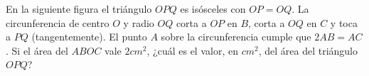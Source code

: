 En la siguiente figura el triángulo $OPQ$ es isósceles con $OP = OQ$. La circunferencia de centro $O$ y radio $OQ$ corta a $OP$ en $B$, corta a $OQ$ en $C$ y toca a $PQ$ (tangentemente). El punto $A$ sobre la circunferencia cumple que $2AB = AC$. Si el área del $ABOC$ vale $2cm^2$, ¿cuál es el valor, en $cm^2$, del área del triángulo $OPQ$?